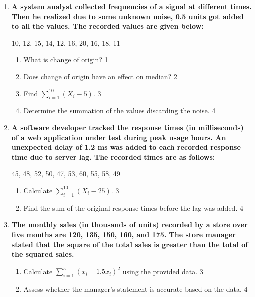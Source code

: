 \documentclass[a4paper,oneside]{book}
\begin{document}
\begin{enumerate}

     \item
	  \textbf{A system analyst collected frequencies of a signal at different times. Then he realized due to some unknown noise, 0.5 units got added to all the values. The recorded values are given below:} 
	  
	  \begin{center}
	  10, 12, 15, 14, 12, 16, 20, 16, 18, 11
	  \end{center}
  
  \begin{enumerate}
    \item
	What is change of origin? \hfill 1
    \item
	Does change of origin have an effect on median? \hfill 2
    \item  
	Find $\displaystyle \sum_{i=1}^{10} (X_i-5)$. \hfill 3
    \item
	Determine the summation of the values discarding the noise. \hfill 4
  \end{enumerate}
  
  \item
\textbf{A software developer tracked the response times (in milliseconds) 
of a web application under test during peak usage hours. An unexpected 
delay of 1.2 ms was added to each recorded response time due to server
lag. The recorded times are as follows:}

\begin{center}
45, 48, 52, 50, 47, 53, 60, 55, 58, 49
\end{center}

\begin{enumerate}
    \item  
    Calculate $\displaystyle \sum_{i=1}^{10} (X_i - 25)$. \hfill 3
    \item
    Find the sum of the original response times before the lag was added. \hfill 4
\end{enumerate}

  
  \item
\textbf{The monthly sales (in thousands of units) recorded by a store over 
five months are 120, 135, 150, 160, and 175. The store manager 
stated that the square of the total sales is greater than the total of 
the squared sales.}

\begin{enumerate}
    \item  
    Calculate $\displaystyle \sum_{i=1}^5 (x_i - 1.5x_i)^2$ using the 
    provided data. \hfill 3
    \item
    Assess whether the manager’s statement is accurate based on the data. \hfill 4
\end{enumerate}



\end{enumerate}
\end{document}
